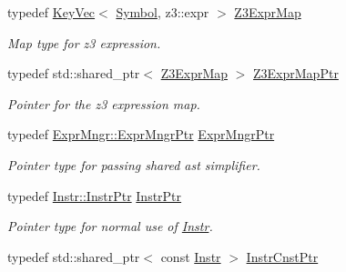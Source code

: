 \begin{DoxyCompactItemize}
\mbox{\label{namespaceilang_a9e34b145b7ce30f509c336c32013c097}} 
typedef \mbox{\hyperlink{classilang_1_1_key_vec}{Key\+Vec}}$<$ \mbox{\hyperlink{classilang_1_1_symbol}{Symbol}}, z3\+::expr $>$ \mbox{\hyperlink{namespaceilang_a9e34b145b7ce30f509c336c32013c097}{Z3\+Expr\+Map}}
\begin{DoxyCompactList}\small\item\em Map type for z3 expression. \end{DoxyCompactList}\item 
\mbox{\label{namespaceilang_a96aa5111edd013874f3cfd7de9bf11bc}} 
typedef std\+::shared\+\_\+ptr$<$ \mbox{\hyperlink{namespaceilang_a9e34b145b7ce30f509c336c32013c097}{Z3\+Expr\+Map}} $>$ \mbox{\hyperlink{namespaceilang_a96aa5111edd013874f3cfd7de9bf11bc}{Z3\+Expr\+Map\+Ptr}}
\begin{DoxyCompactList}\small\item\em Pointer for the z3 expression map. \end{DoxyCompactList}\item 
\mbox{\label{namespaceilang_a4ee5051111191e26d672ae214bcf3e1b}} 
typedef \mbox{\hyperlink{classilang_1_1_expr_mngr_ad35ebf0cecad6f10877667b766bdfac1}{Expr\+Mngr\+::\+Expr\+Mngr\+Ptr}} \mbox{\hyperlink{namespaceilang_a4ee5051111191e26d672ae214bcf3e1b}{Expr\+Mngr\+Ptr}}
\begin{DoxyCompactList}\small\item\em Pointer type for passing shared ast simplifier. \end{DoxyCompactList}\item 
\mbox{\label{namespaceilang_af88a19312ae653d687a0d1207bb284f6}} 
typedef \mbox{\hyperlink{classilang_1_1_instr_af43ebb1fe223b369e42b5600f902b4b4}{Instr\+::\+Instr\+Ptr}} \mbox{\hyperlink{namespaceilang_af88a19312ae653d687a0d1207bb284f6}{Instr\+Ptr}}
\begin{DoxyCompactList}\small\item\em Pointer type for normal use of \mbox{\hyperlink{classilang_1_1_instr}{Instr}}. \end{DoxyCompactList}\item 
\mbox{\label{namespaceilang_a13249a9b1d22eb3454730a7903be4364}} 
typedef std\+::shared\+\_\+ptr$<$ const \mbox{\hyperlink{classilang_1_1_instr}{Instr}} $>$ \mbox{\hyperlink{namespaceilang_a13249a9b1d22eb3454730a7903be4364}{Instr\+Cnst\+Ptr}}

\end{DoxyCompactItemize}
